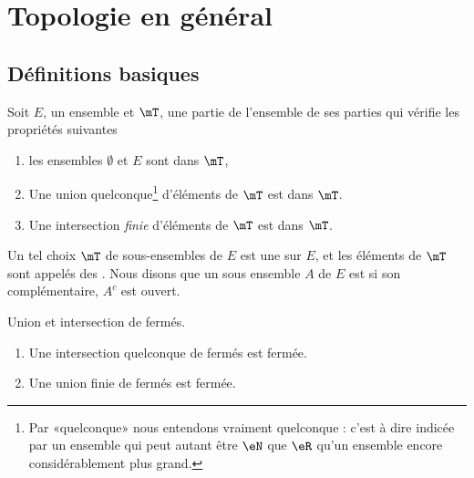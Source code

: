 
\section{Topologie en général}

\subsection{Définitions basiques}

\begin{definition}		\label{DefTopologieGene}
Soit $E$, un ensemble et $\mT$, une partie de l'ensemble de ses parties qui vérifie les propriétés suivantes
\begin{enumerate}
\item
les ensembles $\emptyset$ et $E$ sont dans $\mT$,
\item
    Une union quelconque\footnote{Par «quelconque» nous entendons vraiment quelconque : c'est à dire indicée par un ensemble qui peut autant être \( \eN\) que \( \eR\) 
    qu'un ensemble encore considérablement plus grand.} d'éléments de \( \mT\) est dans \( \mT\).
\item
    Une intersection \emph{finie} d'éléments de \( \mT\) est dans \( \mT\).

\end{enumerate}
Un tel choix $\mT$ de sous-ensembles de $E$ est une   sur $E$, et les éléments de $\mT$ sont appelés des . Nous disons que un sous ensemble $A$ de $E$ est  si son complémentaire, $A^c$ est ouvert.
\end{definition}

\begin{lemma}   \label{LemQYUJwPC}
    Union et intersection de fermés.
    \begin{enumerate}
        \item
            Une intersection quelconque de fermés est fermée.
        \item       \label{ItemKJYVooMBmMbG}
            Une union finie de fermés est fermée.
    \end{enumerate}
\end{lemma}


